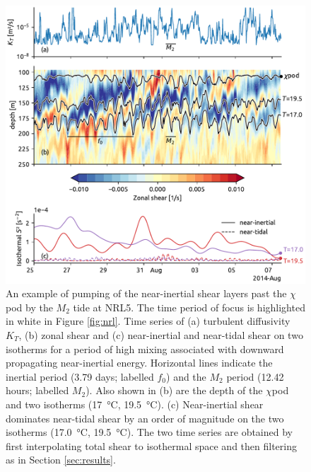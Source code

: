 \documentclass[onecol]{ametsoc}
\begin{document}
\begin{figure}
\centering
\includegraphics[width=39pc]{figure9-tidal-pumping.pdf}
\caption{\label{fig:nrl5-niw}
An example of pumping of the near-inertial shear layers past the \(\chi\)pod by the \(M_2\) tide at NRL5. The time period of focus is highlighted in white in Figure \ref{fig:nrl}. Time series of (a) turbulent diffusivity \(K_T\), (b) zonal shear and (c) near-inertial and near-tidal shear on two isotherms for a period of high mixing associated with downward propagating near-inertial energy. Horizontal lines indicate the inertial period (3.79 days; labelled \(f_0\)) and the \(M_2\) period (12.42 hours; labelled \(M_2\)). Also shown in (b) are the depth of the \(\chi\)pod and two isotherms (\SI{17}{\celsius}, \SI{19.5}{\celsius}). (c) Near-inertial shear dominates near-tidal shear by an order of magnitude on the two isotherms (\SI{17.0}{\celsius}, \SI{19.5}{\celsius}). The two time series are obtained by first interpolating total shear to isothermal space and then filtering as in Section \ref{sec:results}.}
\end{figure}
\end{document}

